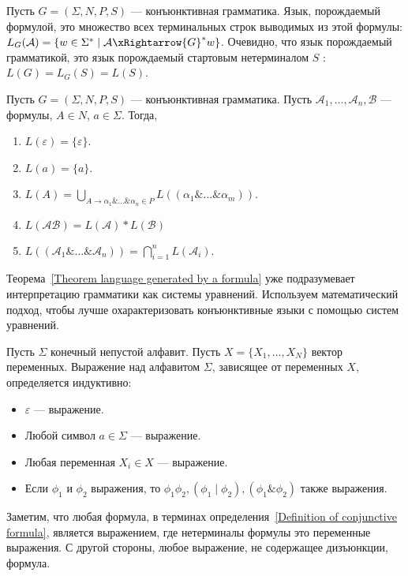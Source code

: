 \begin{definition}
	Пусть $G = (\Sigma,N,P,S)$ --- конъюнктивная грамматика. Язык, порождаемый формулой, это множество всех терминальных строк выводимых из этой формулы: $L_{G}(\mathcal{A}) = \{w\in\Sigma^* \mid \mathcal{A} \xRightarrow{G}^*w\}$. Очевидно, что язык порождаемый грамматикой, это язык порождаемый стартовым нетерминалом $S$ : $L(G) = L_{G}(S) = L(S)$.
\end{definition}

\begin{theorem}\label{Theorem language generated by a formula}
    Пусть $G = (\Sigma,N,P,S)$ --- конъюнктивная грамматика. Пусть $\mathcal{A}_1,\ldots,\mathcal{A}_n,\mathcal{B}$ --- формулы, $A \in N$, $a \in \Sigma$. Тогда,
    \begin{enumerate}
        \item $L(\varepsilon) = \{\varepsilon\}$.
        \item $L(a) = \{a\}$.
        \item $L(A) = \bigcup_{A \rightarrow \alpha_1\&\ldots\&\alpha_n \in P} L((\alpha_1\&\ldots\&\alpha_m))$.
        \item $L(\mathcal{AB}) = L(\mathcal{A})*L(\mathcal{B})$
        \item $L((\mathcal{A}_1\&\ldots\&\mathcal{A}_n)) = \bigcap_{i = 1}^{n}L(\mathcal{A}_i)$.
    \end{enumerate}
\end{theorem}

Теорема~\ref{Theorem language generated by a formula} уже подразумевает интерпретацию грамматики как системы уравнений. Используем математический подход, чтобы лучше охарактеризовать конъюнктивные языки с помощью систем уравнений.

\begin{definition}[Выражение]
    Пусть $\Sigma$ конечный непустой алфавит. Пусть $X = \{X_1,\ldots,X_N\}$ вектор переменных. Выражение над алфавитом $\Sigma$, зависящее от переменных $X$, определяется индуктивно:
    \begin{itemize}
	   \item $\varepsilon$ --- выражение.
	   \item Любой символ $a\in\Sigma$ --- выражение.
	   \item Любая переменная $X_i\in X$ --- выражение.
	   \item Если $\phi_1$ и $\phi_2$ выражения, то $\phi_1\phi_2, (\phi_1\mid\phi_2), (\phi_1\&\phi_2)$ также выражения.
	\end{itemize}
	Заметим, что любая формула, в терминах определения~\ref{Definition of conjunctive formula}, является выражением, где нетерминалы формулы это переменные выражения. С другой стороны, любое выражение, не содержащее дизъюнкции, формула.
\end{definition}

